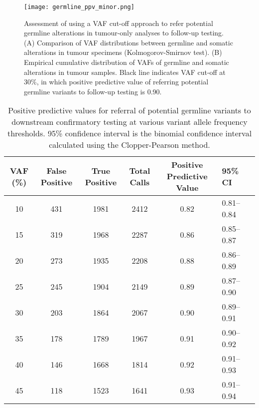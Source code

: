 
\begin{figure}[H]
	\texttt{[image: germline\_ppv\_minor.png]}
	\caption[Assessment of using a VAF cut-off approach to refer potential germline alterations in tumour-only analyses to follow-up testing.]{Assessment of using a VAF cut-off approach to refer potential germline alterations in tumour-only analyses to follow-up testing. (A) Comparison of VAF distributions between germline and somatic alterations in tumour specimens (Kolmogorov-Smirnov test). (B) Empirical cumulative distribution of VAFs of germline and somatic alterations in tumour samples. Black line indicates VAF cut-off at 30\%, in which positive predictive value of referring potential germline variants to follow-up testing is 0.90.}
	\label{fig:germline_ppv_minor}
\end{figure}


\begin{table}[H]
\caption[Positive predictive values for referral of potential germline variants to downstream confirmatory testing at various variant allele frequency thresholds.]{Positive predictive values for referral of potential germline variants to downstream confirmatory testing at various variant allele frequency thresholds. 95\% confidence interval is the binomial confidence interval calculated using the Clopper-Pearson method.}
\label{tbl:ppv}
\centering
      \begin{tabular}{cccccll}
        \hline
        VAF (\%) & False Positive & True Positive & Total Calls & Positive Predictive Value & 95\% CI
        \\
        \hline
        10 & 431 & 1981 & 2412 & 0.82 & 0.81--0.84
        \\
        15 & 319 & 1968 & 2287 & 0.86 & 0.85--0.87
        \\
        20 & 273 & 1935 & 2208 & 0.88 & 0.86--0.89
        \\
        25 & 245 & 1904 & 2149 & 0.89 & 0.87--0.90
        \\
        30 & 203 & 1864 & 2067 & 0.90 & 0.89--0.91
        \\
        35 & 178 & 1789 & 1967 & 0.91 & 0.90--0.92
        \\
        40 & 146 & 1668 & 1814 & 0.92 & 0.91--0.93
        \\
        45 & 118 & 1523 & 1641 & 0.93 & 0.91--0.94
        \\
				\hline
      \end{tabular} \\
\end{table}

